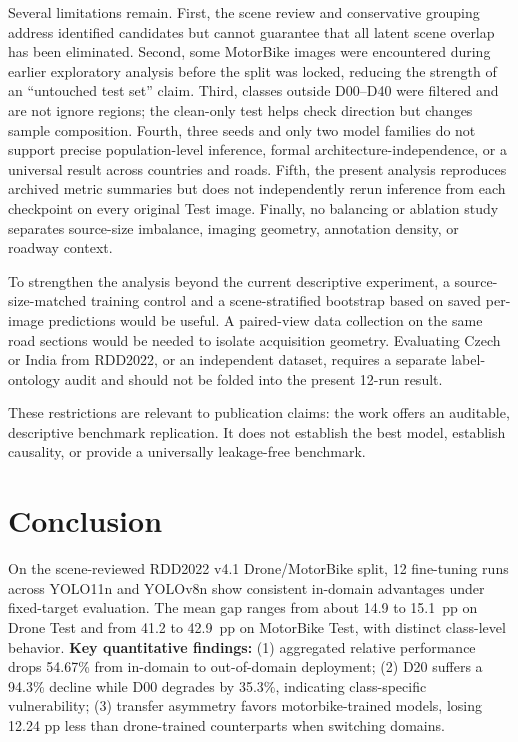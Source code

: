 \documentclass[conference,a4paper]{IEEEtran}
\begin{document}
Several limitations remain. First, the scene review and conservative grouping address identified candidates but cannot guarantee that all latent scene overlap has been eliminated. Second, some MotorBike images were encountered during earlier exploratory analysis before the split was locked, reducing the strength of an ``untouched test set'' claim. Third, classes outside D00--D40 were filtered and are not ignore regions; the clean-only test helps check direction but changes sample composition. Fourth, three seeds and only two model families do not support precise population-level inference, formal architecture-independence, or a universal result across countries and roads. Fifth, the present analysis reproduces archived metric summaries but does not independently rerun inference from each checkpoint on every original Test image. Finally, no balancing or ablation study separates source-size imbalance, imaging geometry, annotation density, or roadway context.

To strengthen the analysis beyond the current descriptive experiment, a source-size-matched training control and a scene-stratified bootstrap based on saved per-image predictions would be useful. A paired-view data collection on the same road sections would be needed to isolate acquisition geometry. Evaluating Czech or India from RDD2022, or an independent dataset, requires a separate label-ontology audit and should not be folded into the present 12-run result.

These restrictions are relevant to publication claims: the work offers an auditable, descriptive benchmark replication. It does not establish the best model, establish causality, or provide a universally leakage-free benchmark.

\section{Conclusion}
On the scene-reviewed RDD2022 v4.1 Drone/MotorBike split, 12 fine-tuning runs across YOLO11n and YOLOv8n show consistent in-domain advantages under fixed-target evaluation. The mean gap ranges from about 14.9 to 15.1~pp on Drone Test and from 41.2 to 42.9~pp on MotorBike Test, with distinct class-level behavior. \textbf{Key quantitative findings:} (1) aggregated relative performance drops 54.67\% from in-domain to out-of-domain deployment; (2) D20 suffers a 94.3\% decline while D00 degrades by 35.3\%, indicating class-specific vulnerability; (3) transfer asymmetry favors motorbike-trained models, losing 12.24 pp less than drone-trained counterparts when switching domains.
\end{document}
